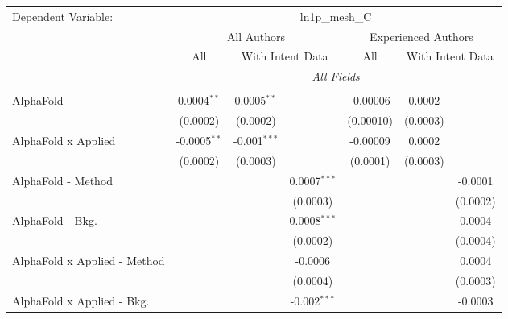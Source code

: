 \begingroup
\centering
\begin{tabular}{lcccccc}
   \tabularnewline \midrule \midrule
   Dependent Variable: & \multicolumn{6}{c}{ln1p\_mesh\_C}\\
 & \multicolumn{3}{c}{All Authors} & \multicolumn{3}{c}{Experienced Authors} \\
\cmidrule(lr){2-4} \cmidrule(lr){5-7}
 & \multicolumn{1}{c}{All} & \multicolumn{2}{c}{With Intent Data} & \multicolumn{1}{c}{All} & \multicolumn{2}{c}{With Intent Data} \\
\cmidrule(lr){2-2} \cmidrule(lr){3-4} \cmidrule(lr){5-5} \cmidrule(lr){6-7}
 & \multicolumn{6}{c}{\textit{All Fields}} \\ \\
   AlphaFold                      & 0.0004$^{**}$  & 0.0005$^{**}$  &                & -0.00006  & 0.0002         &   \\   
                                  & (0.0002)       & (0.0002)       &                & (0.00010) & (0.0003)       &   \\   
   AlphaFold x Applied            & -0.0005$^{**}$ & -0.001$^{***}$ &                & -0.00009  & 0.0002         &   \\   
                                  & (0.0002)       & (0.0003)       &                & (0.0001)  & (0.0003)       &   \\   
   AlphaFold - Method             &                &                & 0.0007$^{***}$ &           &                & -0.0001\\   
                                  &                &                & (0.0003)       &           &                & (0.0002)\\   
   AlphaFold - Bkg.               &                &                & 0.0008$^{***}$ &           &                & 0.0004\\   
                                  &                &                & (0.0002)       &           &                & (0.0004)\\   
   AlphaFold x Applied - Method   &                &                & -0.0006        &           &                & 0.0004\\   
                                  &                &                & (0.0004)       &           &                & (0.0003)\\   
   AlphaFold x Applied - Bkg.     &                &                & -0.002$^{***}$ &           &                & -0.0003\\   

\end{tabular}
